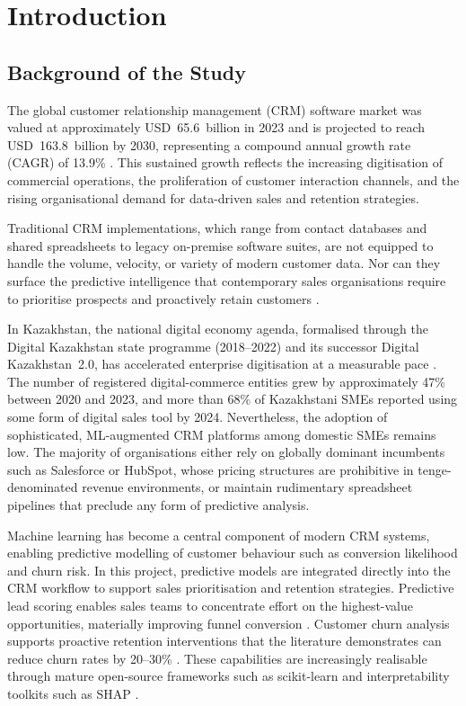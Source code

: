\chapter{Introduction}
\label{chap:intro}
%
\section{Background of the Study}

The global customer relationship management (CRM) software market was
valued at approximately USD~65.6~billion in 2023 and is projected to
reach USD~163.8~billion by 2030, representing a compound annual growth
rate (CAGR) of 13.9\% \citep{grandview2023}. This sustained growth
reflects the increasing digitisation of commercial operations, the
proliferation of customer interaction channels, and the rising
organisational demand for data-driven sales and retention strategies.

Traditional CRM implementations, which range from contact databases and
shared spreadsheets to legacy on-premise software suites, are not
equipped to handle the volume, velocity, or variety of modern customer
data. Nor can they surface the predictive intelligence that contemporary
sales organisations require to prioritise prospects and proactively retain
customers \citep{buttle2019}.

In Kazakhstan, the national digital economy agenda, formalised through the
Digital Kazakhstan state programme (2018--2022) and its successor Digital
Kazakhstan~2.0, has accelerated enterprise digitisation at a measurable
pace \citep{kazakhstan2024digital}. The number of registered
digital-commerce entities grew by approximately 47\% between 2020 and
2023, and more than 68\% of Kazakhstani SMEs reported using some form of
digital sales tool by 2024. Nevertheless, the adoption of sophisticated,
ML-augmented CRM platforms among domestic SMEs remains low. The majority
of organisations either rely on globally dominant incumbents such as
Salesforce or HubSpot, whose pricing structures are prohibitive in
tenge-denominated revenue environments, or maintain rudimentary
spreadsheet pipelines that preclude any form of predictive analysis.

Machine learning has become a central component of modern CRM systems, 
enabling predictive modelling of customer behaviour such as conversion 
likelihood and churn risk. In this project, predictive models are integrated 
directly into the CRM workflow to support sales prioritisation and retention 
strategies. Predictive lead scoring enables sales teams to concentrate effort 
on the highest-value opportunities, materially improving funnel conversion 
\citep{verbeke2012}. Customer churn analysis supports proactive retention 
interventions that the literature demonstrates can reduce churn rates 
by 20--30\% \citep{verbeke2012}. These capabilities are increasingly 
realisable through mature open-source frameworks such as scikit-learn 
\citep{chen2016xgboost} and interpretability toolkits such as SHAP \citep{lundberg2017shap}.

